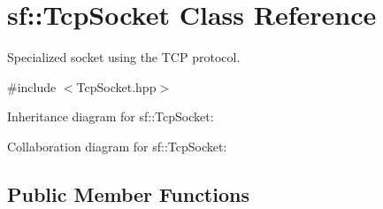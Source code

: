 \hypertarget{classsf_1_1_tcp_socket}{}\section{sf\+:\+:Tcp\+Socket Class Reference}
\label{classsf_1_1_tcp_socket}


Specialized socket using the T\+CP protocol.  




{\ttfamily \#include $<$Tcp\+Socket.\+hpp$>$}



Inheritance diagram for sf\+:\+:Tcp\+Socket\+:


Collaboration diagram for sf\+:\+:Tcp\+Socket\+:
\subsection*{Public Member Functions}
